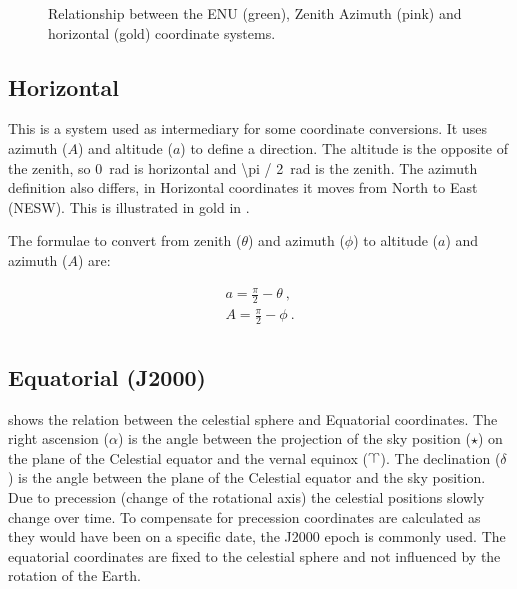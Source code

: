 \begin{figure}
    \centering
    
    \caption{Relationship between the ENU (green), Zenith Azimuth (pink)
             and horizontal (gold) coordinate systems.}
    \label{fig:enu_horizontal}
\end{figure}


\subsection{Horizontal}

This is a system used as intermediary for some coordinate conversions.
It uses azimuth ($A$) and altitude ($a$) to define a direction. The
altitude is the opposite of the zenith, so \SI{0}{\radian} is horizontal
and \SI{\pi / 2}{\radian} is the zenith. The azimuth definition also
differs, in Horizontal coordinates it moves from North to East (NESW).
This is illustrated in gold in .

The formulae to convert from zenith ($\theta$) and azimuth ($\phi$) to
altitude ($a$) and azimuth ($A$) are:

\begin{equation}
    \begin{array}{l}
        a = \frac{\pi}{2} - \theta \ , \\
        A = \frac{\pi}{2} - \phi \ . \\
    \end{array}
\end{equation}


\subsection{Equatorial (J2000)}

 shows the relation between the celestial sphere
and Equatorial coordinates. The right ascension ($\alpha$) is the angle
between the projection of the sky position ($\star$) on the plane of the
Celestial equator and the vernal equinox ($\vernal$). The declination
($\delta$) is the angle between the plane of the Celestial equator and
the sky position. Due to precession (change of the rotational axis) the
celestial positions slowly change over time. To compensate for
precession coordinates are calculated as they would have been on a
specific date, the J2000 epoch is commonly used. The equatorial
coordinates are fixed to the celestial sphere and not influenced by the
rotation of the Earth.

